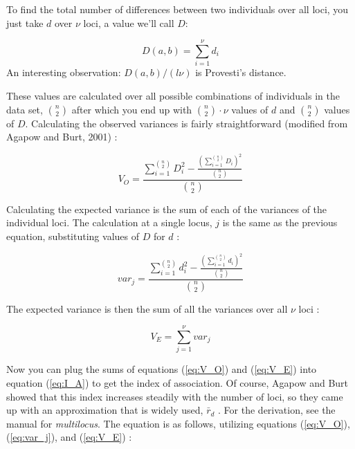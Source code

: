 \documentclass[letterpaper]{article}\usepackage[]{graphicx}\usepackage[]{color}
\begin{document}

\noindent
To find the total number of differences between two individuals over all loci,
you just take $d$ over $\nu$ loci, a value we'll call $D$:

\begin{equation}
\label{eq:ia_D}
D(a,b) = \displaystyle \sum_{i=1}^{\nu} d_i
\end{equation}
An interesting observation: $D(a,b)/(l\nu)$ is Provesti's distance.

These values are calculated over all possible combinations of individuals in the
data set, ${n \choose 2}$ after which you end up with ${n \choose 2}\cdot{}\nu$
values of $d$ and ${n \choose 2}$ values of $D$. Calculating the observed
variances is fairly straightforward (modified from Agapow and Burt, 2001)
\cite{Agapow:2001}:

\begin{equation}
\label{eq:V_O}
V_O = \frac{\displaystyle \sum_{i=1}^{n \choose 2} D_{i}^2 - \frac{\left(\displaystyle\sum_{i=1}^{n \choose 2} D_{i}\right)^2}{{n \choose 2}}}{{n \choose 2}}
\end{equation}

Calculating the expected variance is the sum of each of the variances of the
individual loci. The calculation at a single locus, $j$ is the same as the
previous equation, substituting values of $D$ for $d$ \cite{Agapow:2001}:

\begin{equation}
\label{eq:var_j}
var_j = \frac{\displaystyle \sum_{i=1}^{n \choose 2} d_{i}^2 - \frac{\left(\displaystyle\sum_{i=1}^{n \choose 2} d_i\right)^2}{{n \choose 2}}}{{n \choose 2}}
\end{equation}

The expected variance is then the sum of all the variances over all $\nu$ loci
\cite{Agapow:2001}:

\begin{equation}
\label{eq:V_E}
V_E = \displaystyle \sum_{j=1}^{\nu} var_j
\end{equation}

Now you can plug the sums of equations (\ref{eq:V_O}) and (\ref{eq:V_E}) into
equation (\ref{eq:I_A}) to get the index of association. Of course, Agapow and
Burt showed that this index increases steadily with the number of loci, so they
came up with an approximation that is widely used, $\bar r_d$
\cite{Agapow:2001}. For the derivation, see the manual for \textit{multilocus}.
The equation is as follows, utilizing equations (\ref{eq:V_O}),
(\ref{eq:var_j}), and (\ref{eq:V_E}) \cite{Agapow:2001}:
\end{document}
